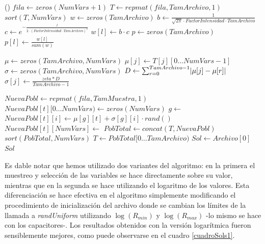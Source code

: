 \documentclass{llncs}
\DeclarePairedDelimiter\abs{\lvert}{\rvert}
\begin{document}
\begin{algorithm}[H]
\begin{algorithmic}[1]
			()
			\State $fila \gets zeros(NumVars+1)$
			\State $T \gets repmat(fila, TamArchivo, 1)$
			\State {}
			\State $sort(T, NumVars)$
			\State $w \gets zeros(TamArchivo)$ 
			\State $b \gets  \frac{1}{\sqrt{2\pi} \cdot FactorIntensidad \cdot TamArchivo}$
			\State $c \gets e^{-\frac{l}{2 \cdot (FactorIntensidad \cdot TamArchivo)^2}}$
			\State $w[l] \gets b \cdot c $ 
			\EndFor
			\State $p \gets zeros(TamArchivo)$ 
			\State $p[l] \gets \frac{w[l]}{sum(w)}$
			\EndFor
			\item[]
			 
			\State $\mu \gets zeros(TamArchivo, NumVars)$ 
			\State $\mu[j] \gets T[j][0 \dots NumVars - 1]$
			\EndFor
			\State $\sigma \gets zeros(TamArchivo, NumVars)$ 
			\State $D \gets \sum_{r=0}^{TamArchivo - 1}\abs{\mu[j]-\mu[r]}$
			\State $\sigma[j] \gets \frac{zeta * D}{TamArchivo -1}$
			\EndFor
			\item[]
			\State $NuevaPobl \gets repmat(fila, TamMuestra, 1)$
			\State $NuevaPobl[t]\lbrack 0 \dots NumVars \rparen \gets zeros(NumVars)$
			\State $g \gets$  
			\State $NuevaPobl[t][i] \gets \mu[g][t] + \sigma[g][i] \cdot rand()$
			\EndFor
			\State $NuevaPobl[t][NumVars] \gets$ 
			\EndFor
			\State $PobTotal \gets concat(T, NuevaPobl)$
			\State $sort(PobTotal, NumVars)$
			\State $T \gets PobTotal \lbrack 0 \dots TamArchivo \rparen$ 
			\EndFor
			\State $Sol \gets Archivo[0]$
			\State \Return $Sol$
			\EndFunction
		\end{algorithmic}
	\end{algorithm}

	Es dable notar que hemos utilizado dos variantes del algoritmo: en la primera el muestreo y selección de las variables 
	se hace directamente sobre su valor, mientras que en la segunda se hace utilizando el logaritmo de los valores. Esta 
	diferenciación se hace efectiva en el algoritmo simplemente modificando el procedimiento de inicialización del archivo donde
	se cambian los límites de la llamada a \textit{randUniform} utilizando $\log(R_{min})$ y $\log(R_{max})$ -lo mismo se hace
	con los capacitores-. Los resultados obtenidos con la versión logarítmica fueron sensiblemente mejores, como puede observarse
	en el cuadro \ref{cuadroSols1}.
	
\end{document}
